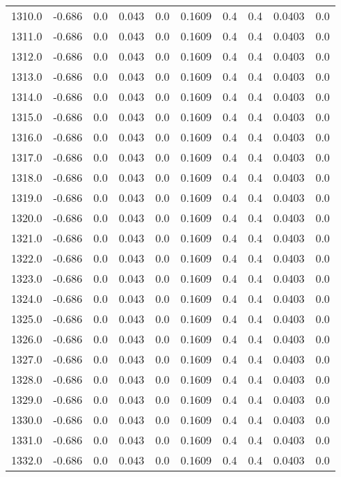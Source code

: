 \begin{longtable}{lrrrrrrrrr}
1310.0 & -0.686 & 0.0 & 0.043 & 0.0 & 0.1609 & 0.4 & 0.4 & 0.0403 & 0.0 \\
1311.0 & -0.686 & 0.0 & 0.043 & 0.0 & 0.1609 & 0.4 & 0.4 & 0.0403 & 0.0 \\
1312.0 & -0.686 & 0.0 & 0.043 & 0.0 & 0.1609 & 0.4 & 0.4 & 0.0403 & 0.0 \\
1313.0 & -0.686 & 0.0 & 0.043 & 0.0 & 0.1609 & 0.4 & 0.4 & 0.0403 & 0.0 \\
1314.0 & -0.686 & 0.0 & 0.043 & 0.0 & 0.1609 & 0.4 & 0.4 & 0.0403 & 0.0 \\
1315.0 & -0.686 & 0.0 & 0.043 & 0.0 & 0.1609 & 0.4 & 0.4 & 0.0403 & 0.0 \\
1316.0 & -0.686 & 0.0 & 0.043 & 0.0 & 0.1609 & 0.4 & 0.4 & 0.0403 & 0.0 \\
1317.0 & -0.686 & 0.0 & 0.043 & 0.0 & 0.1609 & 0.4 & 0.4 & 0.0403 & 0.0 \\
1318.0 & -0.686 & 0.0 & 0.043 & 0.0 & 0.1609 & 0.4 & 0.4 & 0.0403 & 0.0 \\
1319.0 & -0.686 & 0.0 & 0.043 & 0.0 & 0.1609 & 0.4 & 0.4 & 0.0403 & 0.0 \\
1320.0 & -0.686 & 0.0 & 0.043 & 0.0 & 0.1609 & 0.4 & 0.4 & 0.0403 & 0.0 \\
1321.0 & -0.686 & 0.0 & 0.043 & 0.0 & 0.1609 & 0.4 & 0.4 & 0.0403 & 0.0 \\
1322.0 & -0.686 & 0.0 & 0.043 & 0.0 & 0.1609 & 0.4 & 0.4 & 0.0403 & 0.0 \\
1323.0 & -0.686 & 0.0 & 0.043 & 0.0 & 0.1609 & 0.4 & 0.4 & 0.0403 & 0.0 \\
1324.0 & -0.686 & 0.0 & 0.043 & 0.0 & 0.1609 & 0.4 & 0.4 & 0.0403 & 0.0 \\
1325.0 & -0.686 & 0.0 & 0.043 & 0.0 & 0.1609 & 0.4 & 0.4 & 0.0403 & 0.0 \\
1326.0 & -0.686 & 0.0 & 0.043 & 0.0 & 0.1609 & 0.4 & 0.4 & 0.0403 & 0.0 \\
1327.0 & -0.686 & 0.0 & 0.043 & 0.0 & 0.1609 & 0.4 & 0.4 & 0.0403 & 0.0 \\
1328.0 & -0.686 & 0.0 & 0.043 & 0.0 & 0.1609 & 0.4 & 0.4 & 0.0403 & 0.0 \\
1329.0 & -0.686 & 0.0 & 0.043 & 0.0 & 0.1609 & 0.4 & 0.4 & 0.0403 & 0.0 \\
1330.0 & -0.686 & 0.0 & 0.043 & 0.0 & 0.1609 & 0.4 & 0.4 & 0.0403 & 0.0 \\
1331.0 & -0.686 & 0.0 & 0.043 & 0.0 & 0.1609 & 0.4 & 0.4 & 0.0403 & 0.0 \\
1332.0 & -0.686 & 0.0 & 0.043 & 0.0 & 0.1609 & 0.4 & 0.4 & 0.0403 & 0.0 \\

\end{longtable}
